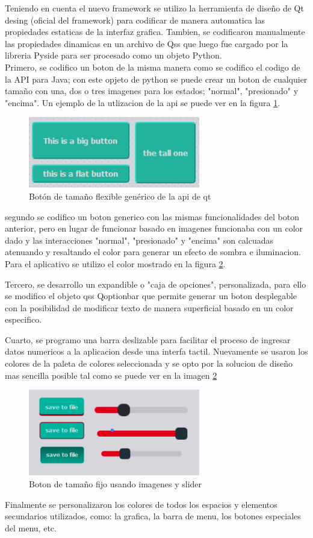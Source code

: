 Teniendo en cuenta el nuevo framework se utilizo la herramienta de diseño de Qt desing (oficial del framework) para codificar de manera automatica las propiedades estaticas de la interfaz grafica. Tambien, se codificaron manualmente las propiedades dinamicas en un archivo de Qss que luego fue cargado por la libreria Pyside para ser procesado como un objeto Python. 
\vspace{0.5cm}\\
Primero, se codifico un boton de la misma manera como se codifico el codigo de la API para Java; con este opjeto de python se puede crear un boton de cualquier tamaño con una, dos o tres imagenes para los estados; "normal", "presionado" y "encima". Un ejemplo de la utlizacion de la api se puede ver en la figura \ref{fig_19}.

\begin{figure}[htbp]
	\centerline{\includegraphics[width=7.5cm]{./figuras/qt_button.png}}
	\caption{Botón de tamaño flexible genérico de la api de qt}
	\label{fig_19}
\end{figure}

segundo se codifico un boton generico con las mismas funcionalidades del boton anterior, pero en lugar de funcionar basado en imagenes funcionaba con un color dado y las interacciones "normal", "presionado" y "encima" son calcuadas atenuando y resaltando el color para generar un efecto de sombra e iluminacion. Para el aplicativo se utilizo el color mostrado en la figura \ref{fig_20}.


Tercero, se desarrollo un expandible o "caja de opciones", personalizada, para ello se modifico el objeto qss Qoptionbar que permite generar un boton desplegable con la posibilidad de modificar texto de manera superficial basado en un color especifico.

Cuarto, se programo una barra deslizable para facilitar el proceso de ingresar datos numericos a la aplicacion desde una interfa tactil. Nuevamente se usaron los colores de la paleta de colores seleccionada y se opto por la solucion de diseño mas sencilla posible tal como se puede ver en la imagen \ref{fig_20}

\begin{figure}[htbp]
	\centerline{\includegraphics[width=7.5cm]{./figuras/qt_button_slide.png}}
	\caption{Boton de tamaño fijo usando imagenes y slider}
	\label{fig_20}
\end{figure}

Finalmente se personalizaron los colores de todos los espacios y elementos secundarios utilizados, como: la grafica, la barra de menu, los botones especiales del menu, etc.








